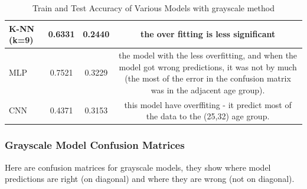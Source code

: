 \documentclass{article}
\begin{document}
\begin{table}[htbp]
\begin{tabular}{lccc}
        \midrule
        K-NN (k=9) & 0.6331 & 0.2440 &  \parbox[t]{6cm}{the over fitting is less significant} \\
        \midrule
        MLP & 0.7521 & 0.3229 & \parbox[t]{6cm}{the model with the less overfitting, and when the model got wrong predictions, it was not by much (the most of the error in the confusion matrix was in the adjacent age group).} \\
        \midrule
        CNN & 0.4371 & 0.3153 & \parbox[t]{6cm}{this model have overffiting - it predict most of the data to the (25,32) age group.} \\
        \bottomrule
    \end{tabular}
    \caption{Train and Test Accuracy of Various Models with grayscale method}
    \label{tab:Grayscale scores}
\end{table}

\subsubsection{Grayscale Model Confusion Matrices}
Here are confusion matrices for grayscale models, they show where model predictions are right (on diagonal) and where they are wrong (not on diagonal).
\end{document}
